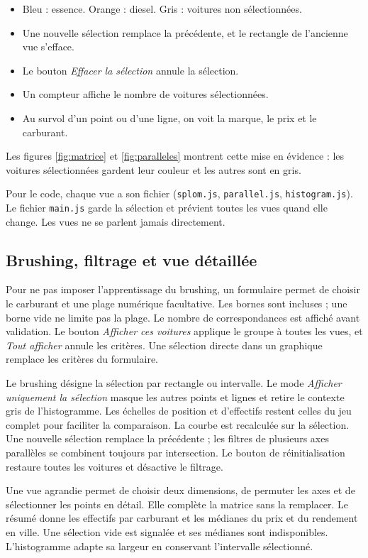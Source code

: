 \documentclass[11pt,a4paper]{article}
\newcommand{\code}[1]{\texttt{#1}}
\begin{document}
\begin{itemize}
  \item Bleu : essence. Orange : diesel. Gris : voitures non sélectionnées.
  \item Une nouvelle sélection remplace la précédente, et le rectangle de l'ancienne vue s'efface.
  \item Le bouton \textit{Effacer la sélection} annule la sélection.
  \item Un compteur affiche le nombre de voitures sélectionnées.
  \item Au survol d'un point ou d'une ligne, on voit la marque, le prix et le carburant.
\end{itemize}

Les figures \ref{fig:matrice} et \ref{fig:paralleles} montrent cette mise en évidence : les voitures sélectionnées gardent leur couleur et les autres sont en gris.

Pour le code, chaque vue a son fichier (\code{splom.js}, \code{parallel.js}, \code{histogram.js}). Le fichier \code{main.js} garde la sélection et prévient toutes les vues quand elle change. Les vues ne se parlent jamais directement.

\subsection{Brushing, filtrage et vue détaillée}

Pour ne pas imposer l'apprentissage du brushing, un formulaire permet de choisir le carburant et une plage numérique facultative. Les bornes sont incluses ; une borne vide ne limite pas la plage. Le nombre de correspondances est affiché avant validation. Le bouton \textit{Afficher ces voitures} applique le groupe à toutes les vues, et \textit{Tout afficher} annule les critères. Une sélection directe dans un graphique remplace les critères du formulaire.

Le brushing désigne la sélection par rectangle ou intervalle. Le mode \textit{Afficher uniquement la sélection} masque les autres points et lignes et retire le contexte gris de l'histogramme. Les échelles de position et d'effectifs restent celles du jeu complet pour faciliter la comparaison. La courbe est recalculée sur la sélection. Une nouvelle sélection remplace la précédente ; les filtres de plusieurs axes parallèles se combinent toujours par intersection. Le bouton de réinitialisation restaure toutes les voitures et désactive le filtrage.

Une vue agrandie permet de choisir deux dimensions, de permuter les axes et de sélectionner les points en détail. Elle complète la matrice sans la remplacer. Le résumé donne les effectifs par carburant et les médianes du prix et du rendement en ville. Une sélection vide est signalée et ses médianes sont indisponibles. L'histogramme adapte sa largeur en conservant l'intervalle sélectionné.
\end{document}
